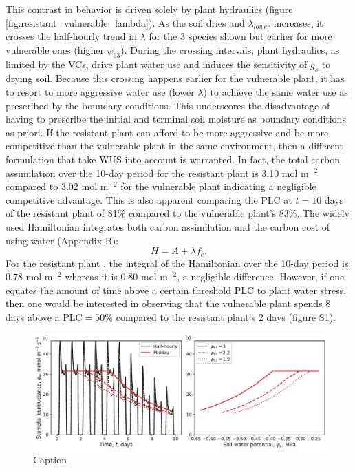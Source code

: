 \documentclass[utf8]{frontiersSCNS} %
\begin{document}
This contrast in behavior is driven solely by plant hydraulics (figure \ref{fig:resistant_vulnerable_lambda}). As the soil dries and $\lambda_{lower}$ increases, it crosses the half-hourly trend in $\lambda$ for the 3 species shown but earlier for more vulnerable ones (higher $\psi_{63}$). During the crossing intervals, plant hydraulics, as limited by the VCs, drive plant water use and induces the sensitivity of $g_s$ to drying soil. Because this crossing happens earlier for the vulnerable plant, it has to resort to more aggressive water use (lower $\lambda$) to achieve the same water use as prescribed by the boundary conditions. This underscores the disadvantage of having to prescribe the initial and terminal soil moisture as boundary conditions as priori. If the resistant plant can afford to be more aggressive and be more competitive than the vulnerable plant in the same environment, then a different formulation that take WUS into account is warranted. In fact, the total carbon assimilation over the 10-day period for the resistant plant is 3.10 mol m$^{-2}$ compared to 3.02 mol m$^{-2}$ for the vulnerable plant indicating a negligible competitive advantage. This is also apparent comparing the PLC at $t=10$ days of the resistant plant of 81\% compared to the vulnerable plant's 83\%. The widely used Hamiltonian integrates both carbon assimilation and the carbon cost of using water (Appendix B):
\begin{equation}
    \label{eqn:Hamiltionian}
    H = A + \lambda f_e.
\end{equation}
For the resistant plant , the integral of the Hamiltonian over the 10-day period is 0.78 mol m$^{-2}$ whereas it is 0.80 mol m$^{-2}$, a negligible difference. However, if one equates the amount of time above a certain threshold PLC to plant water stress, then one would be interested in observing that the vulnerable plant spends 8 days above a PLC$=50\%$ compared to the resistant plant's 2 days (figure S1).

\begin{figure}
    \centering
    \includegraphics[scale=0.75]{Fig5.pdf}
    \caption{Caption}
    \label{fig:resistant_vulnerable_gs_WUS}
\end{figure}
\end{document}
